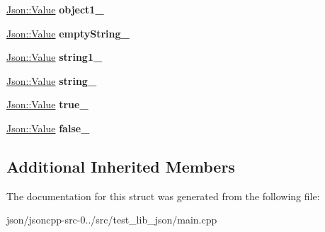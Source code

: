 \begin{DoxyCompactItemize}
\item 
\hypertarget{struct_value_test_ad93b0d31531cd5745c143a37674fcd2a}{\hyperlink{class_json_1_1_value}{Json\+::\+Value} {\bfseries object1\+\_\+}}\label{struct_value_test_ad93b0d31531cd5745c143a37674fcd2a}

\item 
\hypertarget{struct_value_test_aa5077b5f293fd9158de3016f0de790da}{\hyperlink{class_json_1_1_value}{Json\+::\+Value} {\bfseries empty\+String\+\_\+}}\label{struct_value_test_aa5077b5f293fd9158de3016f0de790da}

\item 
\hypertarget{struct_value_test_adc77b94dd8f98a77b996a4ad3264a39d}{\hyperlink{class_json_1_1_value}{Json\+::\+Value} {\bfseries string1\+\_\+}}\label{struct_value_test_adc77b94dd8f98a77b996a4ad3264a39d}

\item 
\hypertarget{struct_value_test_a06dc1765c2cbcbf73f3c88460d956372}{\hyperlink{class_json_1_1_value}{Json\+::\+Value} {\bfseries string\+\_\+}}\label{struct_value_test_a06dc1765c2cbcbf73f3c88460d956372}

\item 
\hypertarget{struct_value_test_ae14719f47b26ef361d475722aabf2e8f}{\hyperlink{class_json_1_1_value}{Json\+::\+Value} {\bfseries true\+\_\+}}\label{struct_value_test_ae14719f47b26ef361d475722aabf2e8f}

\item 
\hypertarget{struct_value_test_a64c3545b2e2c49789c30577454f7be05}{\hyperlink{class_json_1_1_value}{Json\+::\+Value} {\bfseries false\+\_\+}}\label{struct_value_test_a64c3545b2e2c49789c30577454f7be05}

\end{DoxyCompactItemize}
\subsection*{Additional Inherited Members}


The documentation for this struct was generated from the following file\+:\begin{DoxyCompactItemize}
\item 
json/jsoncpp-\/src-\/0../src/test\+\_\+lib\+\_\+json/main.\+cpp\end{DoxyCompactItemize}
